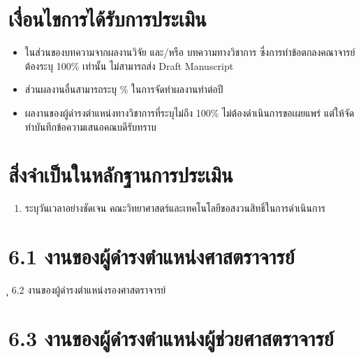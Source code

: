 \documentclass[a4paper,12pt,english]{sphinxmanual}
\begin{document}
\section{เงื่อนไขการได้รับการประเมิน}
\label{\detokenize{6academicposition:id2}}\begin{itemize}
\item {} 
ในส่วนของบทความจากผลงานวิจัย และ/หรือ บทความทางวิชาการ ซึ่งการทำข้อตกลงคณาจารย์ต้องระบุ 100\% เท่านั้น ไม่สามารถส่ง Draft Manuscript

\item {} 
ส่วนผลงานอื่นสามารถระบุ \% ในการจัดทำผลงานทำต่อปี

\item {} 
ผลงานของผู้ดำรงตำแหน่งทางวิชาการที่ระบุไม่ถึง 100\% ไม่ต้องดำเนินการขอเผยแพร่ แต่ให้จัดทำบันทึกข้อความเสนอคณบดีรับทราบ

\end{itemize}


\section{สิ่งจำเป็นในหลักฐานการประเมิน}
\label{\detokenize{6academicposition:id3}}\begin{enumerate}
%
\item {} 
 ระบุวันเวลาอย่างชัดเจน คณะวิทยาศาสตร์และเทคโนโลยีขอสงวนสิทธิ์ในการดำเนินการ

\end{enumerate}


\section{6.1 งานของผู้ดำรงตำแหน่งศาสตราจารย์}
\label{\detokenize{6academicposition:id4}}
ุ
6.2 งานของผู้ดำรงตำแหน่งรองศาสตราจารย์
\sphinxstylestrong{****************************************************************************************************************************}


\section{6.3 งานของผู้ดำรงตำแหน่งผู้ช่วยศาสตราจารย์}
\label{\detokenize{6academicposition:id5}}
\end{document}
